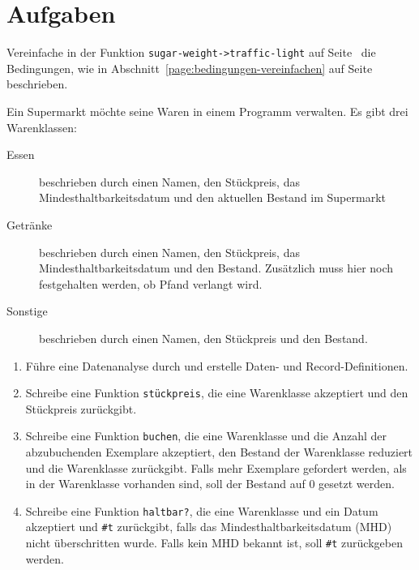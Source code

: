 \section*{Aufgaben}

\begin{aufgabe}
  Vereinfache in der Funktion \lstinline{sugar-weight->traffic-light} auf
  Seite~\pageref{def:sugar-weight-traffic-light} die Bedingungen, wie
  in Abschnitt~\ref{page:bedingungen-vereinfachen} auf
  Seite~\pageref{page:bedingungen-vereinfachen} beschrieben.
\end{aufgabe}

\begin{aufgabe}
  Ein Supermarkt möchte seine Waren in einem Programm verwalten. Es gibt
  drei Warenklassen:
  \begin{description}
  \item[Essen] beschrieben durch einen Namen, den Stückpreis, das Mindesthaltbarkeitsdatum
    und den aktuellen Bestand im Supermarkt
  \item[Getränke] beschrieben durch einen Namen, den Stückpreis, das Mindesthaltbarkeitsdatum
    und den Bestand. Zusätzlich muss hier noch festgehalten werden, ob Pfand verlangt wird.
  \item[Sonstige] beschrieben durch einen Namen, den Stückpreis und den Bestand.
  \end{description}

  
  \begin{enumerate}
  \item Führe eine Datenanalyse durch und erstelle Daten- und 
    Record-Definitionen.
  \item Schreibe eine Funktion \lstinline{stückpreis}, die eine Warenklasse
    akzeptiert und den Stückpreis zurückgibt.
  \item Schreibe eine Funktion \lstinline{buchen}, die eine Warenklasse und die Anzahl der
    abzubuchenden Exemplare akzeptiert, den Bestand der Warenklasse reduziert und die
    Warenklasse zurückgibt. Falls mehr Exemplare gefordert werden, als in der Warenklasse
    vorhanden sind, soll der Bestand auf 0 gesetzt werden.
  \item Schreibe eine Funktion \lstinline{haltbar?}, die eine
    Warenklasse und ein Datum akzeptiert und \lstinline{#t} zurückgibt, falls das
    Mindesthaltbarkeitsdatum (MHD) nicht überschritten wurde. Falls kein MHD bekannt ist,
    soll \lstinline{#t} zurückgeben werden.
  \end{enumerate}
\end{aufgabe}

